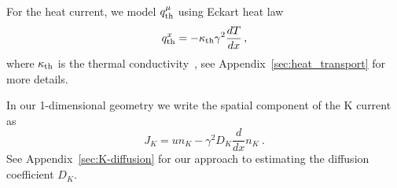 \documentclass[10pt,superscriptaddress,
amsmath,aps,prc,twocolumn,nofootinbib,floatfix]{revtex4-1}
\newcommand{\AHcom}[1]{\textsf{\color{cyan}{\textsuperscript{AH}#1}}}
\newcommand{\JS}[1]{{\color{violet}#1}}
\newcommand{\hide}[1]{}
\begin{document}
For the heat current, we model $q^\mu_{\rm th}$ using Eckart heat law~\cite{Eckart:1940te,Lopez-Monsalvo:2010oeo} 
\begin{equation}
q_{\rm th}^{x}=-\kappa_{\rm th}\gamma^2\frac{dT}{dx} \,,
\label{eq:heat_flux_main}
\end{equation}
where $\kappa_{\rm th}$ is the thermal conductivity~\cite{Heiselberg:1993cr}, see Appendix~\ref{sec:heat_transport} for more details.



%
\hide{
\JS{$J_K^\mu$ is the K current, which is given by the following 1+3 decomposition:
\begin{equation}
J^\mu_K = n_K U^\mu + V^\mu\,,\quad \mbox{where}\quad V^\mu = (V^0, -D_Kn_K', 0, 0)\ .
\label{eq:JK_relativistic}
\end{equation}
$U^\mu$ is the relativistic fluid element four velocity, and $V^\mu$ is the spacial component of $J^\mu_K$ in the fluid element co-moving tetrad that carries information of K diffusion. 
}\AHcom{not every current is conserved, the K current in fact should not be conserved but has a source term}
}

In our 1-dimensional geometry
we write the spatial component of the K current as
\begin{equation}
    J_K = un_K - \gamma^2 D_K\frac{d}{dx}n_K \ .
\end{equation} 
See Appendix~\ref{sec:K-diffusion} for our approach to estimating the diffusion coefficient $D_K$.
\end{document}
